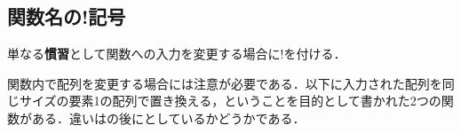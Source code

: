 \subsection{関数名の!記号}
単なる\textbf{慣習}として関数への入力を変更する場合に!を付ける．

関数内で配列を変更する場合には注意が必要である．以下に入力された配列を同じサイズの要素1の配列で置き換える，ということを目的として書かれた2つの関数がある．違いはの後に\jl{[:]}としているかどうかである．
